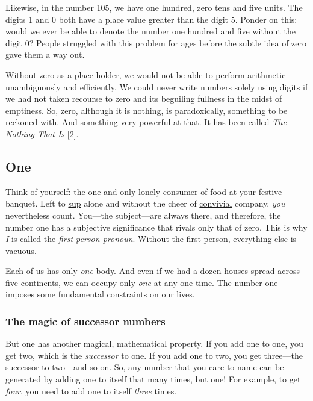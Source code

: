 \documentclass[
  a4paper,
]{article}
\begin{document}
Likewise, in the number 105, we have one hundred, zero tens and five
units. The digits 1 and 0 both have a place value greater than the digit
5. Ponder on this: would we ever be able to denote the number one
hundred and five without the digit 0? People struggled with this problem
for ages before the subtle idea of zero gave them a way out.

Without zero as a place holder, we would not be able to perform
arithmetic unambiguously and efficiently. We could never write numbers
solely using digits if we had not taken recourse to zero and its
beguiling fullness in the midst of emptiness. So, zero, although it is
nothing, is paradoxically, something to be reckoned with. And something
very powerful at that. It has been called
\href{https://www.amazon.in/Nothing-That-Natural-History-Zero/dp/0195142373}{\emph{The
Nothing That Is}} {[}\protect\hyperlink{ref-zero2000}{2}{]}.

\hypertarget{one}{%
\subsection{One}\label{one}}

Think of yourself: the one and only lonely consumer of food at your
festive banquet. Left to
\href{https://www.thefreedictionary.com/sup}{sup} alone and without the
cheer of \href{https://www.dictionary.com/browse/convivial}{convivial}
company, \emph{you} nevertheless count. You---the subject---are always
there, and therefore, the number one has a subjective significance that
rivals only that of zero. This is why \emph{I} is called the \emph{first
person pronoun}. Without the first person, everything else is vacuous.

Each of us has only \emph{one} body. And even if we had a dozen houses
spread across five continents, we can occupy only \emph{one} at any one
time. The number one imposes some fundamental constraints on our lives.

\hypertarget{the-magic-of-successor-numbers}{%
\subsubsection{The magic of successor
numbers}\label{the-magic-of-successor-numbers}}

But one has another magical, mathematical property. If you add one to
one, you get two, which is the \emph{successor} to one. If you add one
to two, you get three---the successor to two---and so on. So, any number
that you care to name can be generated by adding one to itself that many
times, but one! For example, to get \emph{four}, you need to add one to
itself \emph{three} times.
\end{document}
